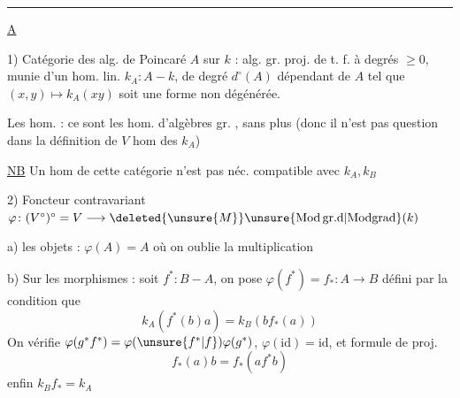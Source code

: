 
\noindent\rule{.91\linewidth}{.4pt}

\uline{A}

1) Catégorie  des alg. de Poincaré $A$ sur $k$ : alg. gr.  proj. de t. f. à degrés $\geq0$, munie d'un hom. lin. $k_A\colon A\mathbin{-}k$, de degré $d^\circ(A)$ dépendant de $A$ tel que $(x,y)\longmapsto k_A(xy)$ soit une forme  non dégénérée. 

Les hom.  : ce sont les hom. d'algèbres gr. , sans plus (donc il n'est pas question dans la définition de $V$ hom des $k_A$)

\uline{NB} Un hom de cette catégorie n'est pas néc. compatible avec  $k_A,k_B$

2) Foncteur contravariant $\varphi\colon (V^\circ)^\circ=V\longrightarrow\deleted{\unsure{M}}\unsure{\mathrm{Mod\,gr.d}|\mathrm{Modgrad}}(k)$

a)  les objets : $\varphi(A)=A$ où on oublie la multiplication

b) Sur les morphismes : soit $f^*\colon B\mathbin{-}A$, on pose $\varphi(f^*)=f_*\colon A\longrightarrow B$ défini par la condition que
\[
k_A(f^*(b)a)=k_B(bf_*(a))
\]
On vérifie $\varphi(g^*f^*)=\varphi(\unsure{f^*|f})\varphi(g^*)$, $\varphi(\mathrm{id})=\mathrm{id}$, et formule de proj.
\[
f_*(a)b=f_*(af^*b)
\]
enfin  $k_B f_*=k_A$

